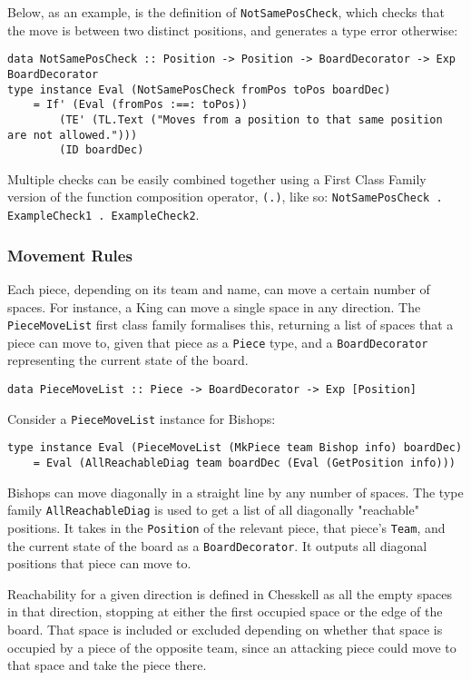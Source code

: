 \documentclass[12pt, a4paper, bibliography=totocnumbered]{scrreprt}
\newcommand{\inline}[1]{\lstinline[basicstyle=\ttfamily\footnotesize]{#1}}
\begin{document}
Below, as an example, is the definition of \inline{NotSamePosCheck}, which checks that the move is between two distinct positions, and generates a type error otherwise:

\begin{lstlisting}
data NotSamePosCheck :: Position -> Position -> BoardDecorator -> Exp BoardDecorator
type instance Eval (NotSamePosCheck fromPos toPos boardDec)
    = If' (Eval (fromPos :==: toPos))
        (TE' (TL.Text ("Moves from a position to that same position are not allowed.")))
        (ID boardDec)
\end{lstlisting}

Multiple checks can be easily combined together using a First Class Family version of the function composition operator, \inline{(.)}, like so: \inline{NotSamePosCheck . ExampleCheck1 . ExampleCheck2}.

\subsubsection{Movement Rules}

Each piece, depending on its team and name, can move a certain number of spaces. For instance, a King can move a single space in any direction. The \inline{PieceMoveList} first class family formalises this, returning a list of spaces that a piece can move to, given that piece as a \inline{Piece} type, and a \inline{BoardDecorator} representing the current state of the board.

\begin{lstlisting}
data PieceMoveList :: Piece -> BoardDecorator -> Exp [Position]
\end{lstlisting}

Consider a \inline{PieceMoveList} instance for Bishops:

\begin{lstlisting}
type instance Eval (PieceMoveList (MkPiece team Bishop info) boardDec)
    = Eval (AllReachableDiag team boardDec (Eval (GetPosition info)))
\end{lstlisting}

Bishops can move diagonally in a straight line by any number of spaces. The type family \inline{AllReachableDiag} is used to get a list of all diagonally "reachable" positions. It takes in the \inline{Position} of the relevant piece, that piece's \inline{Team}, and the current state of the board as a \inline{BoardDecorator}. It outputs all diagonal positions that piece can move to.

Reachability for a given direction is defined in Chesskell as all the empty spaces in that direction, stopping at either the first occupied space or the edge of the board. That space is included or excluded depending on whether that space is occupied by a piece of the opposite team, since an attacking piece could move to that space and take the piece there.
\end{document}
